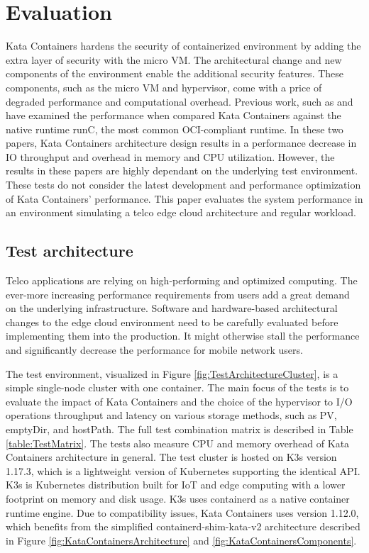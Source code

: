 \chapter{Evaluation}
\label{chapter:evaluation}

Kata Containers hardens the security of containerized environment by adding the extra layer of security with the micro VM. The architectural change and new components of the environment enable the additional security features. These components, such as the micro VM and hypervisor, come with a price of degraded performance and computational overhead. Previous work, such as \cite{EverartsdeVelp2020} and \cite{Kumar2020} have examined the performance when compared Kata Containers against the native runtime runC, the most common OCI-compliant runtime. In these two papers, Kata Containers architecture design results in a performance decrease in IO throughput and overhead in memory and CPU utilization. However, the results in these papers are highly dependant on the underlying test environment. These tests do not consider the latest development and performance optimization of Kata Containers' performance. This paper evaluates the system performance in an environment simulating a telco edge cloud architecture and regular workload.

\section{Test architecture}
\label{section:test_architecture}

Telco applications are relying on high-performing and optimized computing. The ever-more increasing performance requirements from users add a great demand on the underlying infrastructure. Software and hardware-based architectural changes to the edge cloud environment need to be carefully evaluated before implementing them into the production. It might otherwise stall the performance and significantly decrease the performance for mobile network users.

The test environment, visualized in Figure \ref{fig:TestArchitectureCluster}, is a simple single-node cluster with one container. The main focus of the tests is to evaluate the impact of Kata Containers and the choice of the hypervisor to I/O operations throughput and latency on various storage methods, such as PV, emptyDir, and hostPath. The full test combination matrix is described in Table \ref{table:TestMatrix}. The tests also measure CPU and memory overhead of Kata Containers architecture in general. The test cluster is hosted on K3s\cite{K3s} version 1.17.3, which is a lightweight version of Kubernetes supporting the identical API. K3s is Kubernetes distribution built for IoT and edge computing with a lower footprint on memory and disk usage. K3s uses containerd as a native container runtime engine. Due to compatibility issues, Kata Containers uses version 1.12.0, which benefits from the simplified containerd-shim-kata-v2 \cite{KataContainersArchitecture} architecture described in Figure \ref{fig:KataContainersArchitecture} and \ref{fig:KataContainersComponents}.

